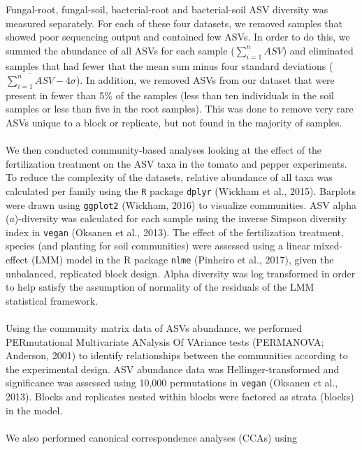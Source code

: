 \documentclass[11pt,]{article}
\begin{document}
Fungal-root, fungal-soil, bacterial-root and bacterial-soil ASV
diversity was measured separately. For each of these four datasets, we
removed samples that showed poor sequencing output and contained few
ASVs. In order to do this, we summed the abundance of all ASVs for each
sample (\(\sum_{i=1}^n ASV\)) and eliminated samples that had fewer that
the mean sum minus four standard deviations
(\(\overline{\sum_{i=1}^n ASV} - 4\sigma\)). In addition, we removed
ASVs from our dataset that were present in fewer than 5\% of the samples
(less than ten individuals in the soil samples or less than five in the
root samples). This was done to remove very rare ASVs unique to a block
or replicate, but not found in the majority of samples.\\
\hspace*{0.333em}\\
We then conducted community-based analyses looking at the effect of the
fertilization treatment on the ASV taxa in the tomato and pepper
experiments. To reduce the complexity of the datasets, relative
abundance of all taxa was calculated per family using the \texttt{R}
package \texttt{dplyr} (Wickham et al., 2015). Barplots were drawn using
\texttt{ggplot2} (Wickham, 2016) to visualize communities. ASV alpha
(\(a\))-diversity was calculated for each sample using the inverse
Simpson diversity index in \texttt{vegan} (Oksanen et al., 2013). The
effect of the fertilization treatment, species (and planting for soil
communities) were assessed using a linear mixed-effect (LMM) model in
the R package \texttt{nlme} (Pinheiro et al., 2017), given the
unbalanced, replicated block design. Alpha diversity was log transformed
in order to help satisfy the assumption of normality of the residuals of
the LMM statistical framework.\\
\hspace*{0.333em}\\
Using the community matrix data of ASVs abundance, we performed
PERmutational Multivariate ANalysis Of VAriance tests (PERMANOVA;
Anderson, 2001) to identify relationships between the communities
according to the experimental design. ASV abundance data was
Hellinger-transformed and significance was assessed using 10,000
permutations in \texttt{vegan} (Oksanen et al., 2013). Blocks and
replicates nested within blocks were factored as strata (blocks) in the
model.\\
\hspace*{0.333em}\\
We also performed canonical correspondence analyses (CCAs) using
\end{document}
